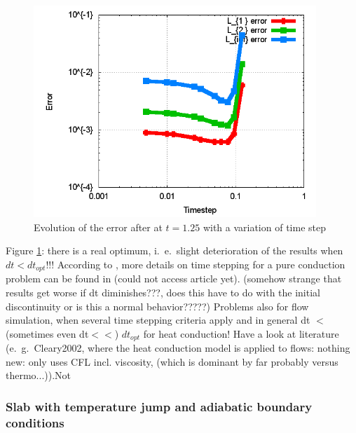 \documentclass{report}
\begin{document}
\begin{figure}[h]  
  \label{fig:PureHeat_dtVerification}
  \centering
  \includegraphics[width=0.95\textwidth]{Graphics/results/PureHeatConduction/ErrorTimestep}
  \caption{Evolution of the error after at $t=1.25$ with a variation of time step}
\end{figure}

Figure \ref{fig:PureHeat_dtVerification}: there is a real optimum, i.\ e.\ slight deterioration of the results when $dt<dt_\mathit{opt}$!!! According to \cite{Cleary1999}, more details on time stepping for a pure conduction problem can be found in \cite{} (could not access article yet).
(somehow strange that results get worse if dt diminishes???, does this have to do with the initial discontinuity or is this a normal behavior?????)
Problems also for flow simulation, when several time stepping criteria apply and in general dt $<$ (sometimes even dt$<<$) $dt_\mathit{opt}$ for heat conduction! Have a look at literature (e.\ g.\ Cleary2002, where the heat conduction model is applied to flows: nothing new: only uses CFL incl. viscosity, (which is dominant by far probably versus thermo...)).Not

\subsubsection{Slab with temperature jump and adiabatic boundary conditions}
\end{document}
